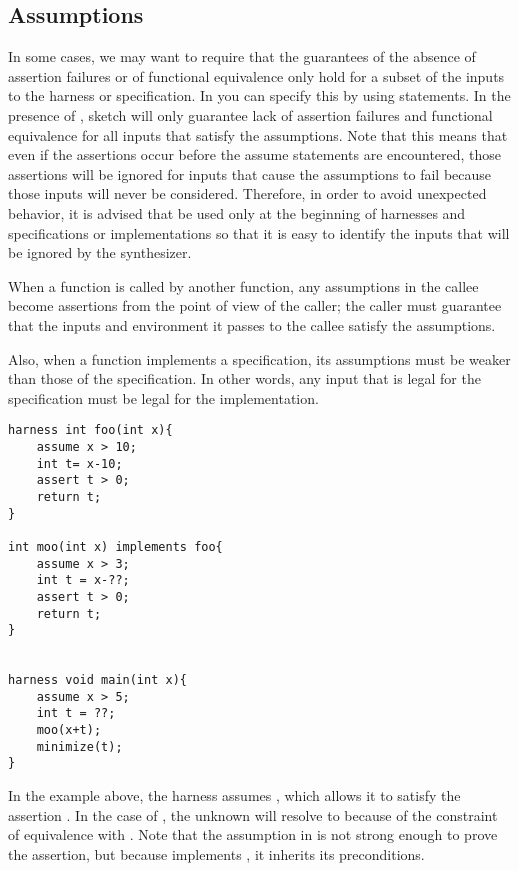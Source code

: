 \subsection{Assumptions}
In some cases, we may want to require that the guarantees of the absence of assertion failures or of functional equivalence only hold for a subset of the inputs to the harness or specification. In \Sk{} you can specify this by using  statements. In the presence of , sketch will only guarantee lack of assertion failures and functional equivalence for all inputs that satisfy the assumptions. Note that this means that even if the assertions occur before the assume statements are encountered, those assertions will be ignored for inputs that cause the assumptions to fail because those inputs will never be considered. Therefore, in order to avoid unexpected behavior, it is advised that  be used only at the beginning of harnesses and specifications or implementations so that it is easy to identify the inputs that will be ignored by the synthesizer.

When a function is called by another function, any assumptions in the callee become assertions from the point of view of the caller; \ie{} the caller must guarantee that the inputs and environment it passes to the callee satisfy the assumptions. 

Also, when a function implements a specification, its assumptions must be weaker than those of the specification. In other words, any input that is legal for the specification must be legal for the implementation. 

\begin{Example}
\begin{lstlisting}
harness int foo(int x){
	assume x > 10;
	int t= x-10;
	assert t > 0;
	return t;
}

int moo(int x) implements foo{
	assume x > 3;
	int t = x-??;
	assert t > 0;
	return t;
}


harness void main(int x){
	assume x > 5;
	int t = ??;
	moo(x+t);
	minimize(t);
}
\end{lstlisting}
In the example above, the harness  assumes , which allows it to satisfy the assertion . In the case of , the unknown will resolve to  because of the constraint of equivalence with . Note that the assumption in  is not strong enough to prove the assertion, but because  implements , it inherits its preconditions. 
\end{Example}


